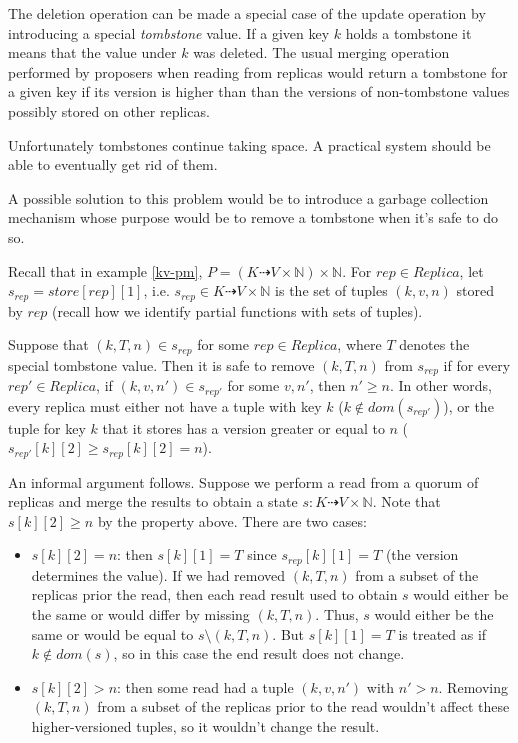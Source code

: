 \documentclass[12pt,a4paper,en]{pracamgr}
\newcommand{\ti}[1]{\textit{#1}}
\newcommand{\mbb}[1]{\mathbb{#1}}
\begin{document}
The deletion operation can be made a special case of the update operation by introducing a special \ti{tombstone} value. If a given key $k$ holds a tombstone it means that the value under $k$ was deleted. The usual merging operation performed by proposers when reading from replicas would return a tombstone for a given key if its version is higher than than the versions of non-tombstone values possibly stored on other replicas.

Unfortunately tombstones continue taking space. A practical system should be able to eventually get rid of them.

A possible solution to this problem would be to introduce a garbage collection mechanism whose purpose would be to remove a tombstone when it's safe to do so.

Recall that in example \ref{kv-pm}, $P = (K \dashrightarrow V \times \mbb N) \times \mbb N$. For $rep \in Replica$, let $s_{rep} = store[rep][1]$, i.e. $s_{rep} \in K \dashrightarrow V \times \mbb N$ is the set of tuples $(k, v, n)$ stored by $rep$ (recall how we identify partial functions with sets of tuples).

Suppose that $(k, T, n) \in s_{rep}$ for some $rep \in Replica$, where $T$ denotes the special tombstone value. Then it is safe to remove $(k, T, n)$ from $s_{rep}$ if for every $rep' \in Replica$, if $(k, v, n') \in s_{rep'}$ for some $v, n'$, then $n' \ge n$. In other words, every replica must either not have a tuple with key $k$ ($k \notin dom(s_{rep'})$), or the tuple for key $k$ that it stores has a version greater or equal to $n$ ($s_{rep'}[k][2] \ge s_{rep}[k][2] = n$).

An informal argument follows. Suppose we perform a read from a quorum of replicas and merge the results to obtain a state $s: K \dashrightarrow V \times \mbb N$. Note that $s[k][2] \ge n$ by the property above. There are two cases:
\begin{itemize}
    \item $s[k][2] = n$: then $s[k][1] = T$ since $s_{rep}[k][1] = T$ (the version determines the value). If we had removed $(k, T, n)$ from a subset of the replicas prior the read, then each read result used to obtain $s$ would either be the same or would differ by missing $(k, T, n)$. Thus, $s$ would either be the same or would be equal to $s \setminus (k, T, n)$. But $s[k][1] = T$ is treated as if $k \notin dom(s)$, so in this case the end result does not change.
    \item $s[k][2] > n$: then some read had a tuple $(k, v, n')$ with $n' > n$. Removing $(k, T, n)$ from a subset of the replicas prior to the read wouldn't affect these higher-versioned tuples, so it wouldn't change the result.
\end{itemize}
\end{document}
